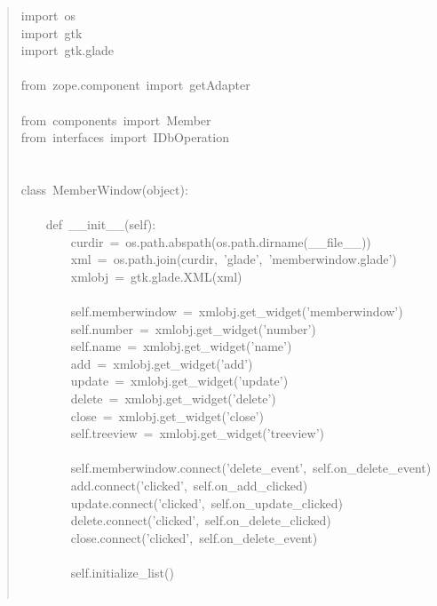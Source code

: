 \documentclass[a4paper,openany,twoside,final]{book}
\begin{document}
\begin{quote}{\ttfamily \raggedright \noindent
import~os\\
import~gtk\\
import~gtk.glade\\
~\\
from~zope.component~import~getAdapter\\
~\\
from~components~import~Member\\
from~interfaces~import~IDbOperation\\
~\\
~\\
class~MemberWindow(object):\\
~\\
~~~~def~\_\_init\_\_(self):\\
~~~~~~~~curdir~=~os.path.abspath(os.path.dirname(\_\_file\_\_))\\
~~~~~~~~xml~=~os.path.join(curdir,~'glade',~'memberwindow.glade')\\
~~~~~~~~xmlobj~=~gtk.glade.XML(xml)\\
~\\
~~~~~~~~self.memberwindow~=~xmlobj.get\_widget('memberwindow')\\
~~~~~~~~self.number~=~xmlobj.get\_widget('number')\\
~~~~~~~~self.name~=~xmlobj.get\_widget('name')\\
~~~~~~~~add~=~xmlobj.get\_widget('add')\\
~~~~~~~~update~=~xmlobj.get\_widget('update')\\
~~~~~~~~delete~=~xmlobj.get\_widget('delete')\\
~~~~~~~~close~=~xmlobj.get\_widget('close')\\
~~~~~~~~self.treeview~=~xmlobj.get\_widget('treeview')\\
~\\
~~~~~~~~self.memberwindow.connect('delete\_event',~self.on\_delete\_event)\\
~~~~~~~~add.connect('clicked',~self.on\_add\_clicked)\\
~~~~~~~~update.connect('clicked',~self.on\_update\_clicked)\\
~~~~~~~~delete.connect('clicked',~self.on\_delete\_clicked)\\
~~~~~~~~close.connect('clicked',~self.on\_delete\_event)\\
~\\
~~~~~~~~self.initialize\_list()\\
~\\
}
\end{quote}
\end{document}
